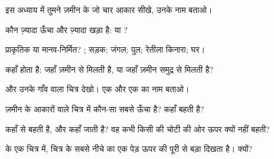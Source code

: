 \begin{exercise}[$\star$]\label{exo:g1:landscapes-around-us:1}
इस अध्याय में तुमने ज़मीन के जो चार आकार सीखे, उनके नाम बताओ।
\end{exercise}

\begin{exercise}[$\star$]\label{exo:g1:landscapes-around-us:2}
कौन ज़्यादा ऊँचा और ज़्यादा खड़ा है:  या ?
\end{exercise}

\begin{exercise}[$\star$]\label{exo:g1:landscapes-around-us:3}
प्राकृतिक या मानव-निर्मित? ; सड़क; जंगल; पुल; रेतीला किनारा; घर।
\end{exercise}

\begin{exercise}[$\star$]\label{exo:g1:landscapes-around-us:4}
 कहाँ होता है: जहाँ ज़मीन  से मिलती है, या जहाँ ज़मीन समुद्र से
मिलती है?
\end{exercise}

\begin{exercise}[$\star$]\label{exo:g1:landscapes-around-us:5}
 और उनके गाँव वाला चित्र देखो। एक  और एक
 का नाम बताओ।
\end{exercise}

\begin{exercise}[$\star$]\label{exo:g1:landscapes-around-us:6}
ज़मीन के आकारों वाले चित्र में कौन-सा  सबसे ऊँचा है?  कहाँ
बहती है?
\end{exercise}

\begin{exercise}[$\star\star$]\label{exo:g1:landscapes-around-us:7}
 कहाँ से बहती है, और कहाँ जाती है? वह कभी किसी  की चोटी की ओर
ऊपर क्यों नहीं बहती?
\end{exercise}

\begin{exercise}[$\star\star$]\label{exo:g1:landscapes-around-us:8}
 के एक चित्र में, चित्र के सबसे नीचे का एक पेड़ ऊपर की पूरी
 से बड़ा दिखता है। क्यों?
\end{exercise}

